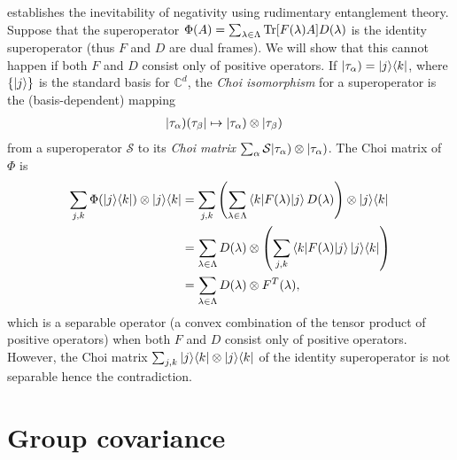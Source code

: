 \cite{ferrie_frame_2008} establishes the inevitability of negativity using rudimentary entanglement theory. Suppose that the superoperator $\Phi(A) = \sum_{\lambda \in \Lambda} \mathrm{Tr} [F(\lambda)A] D(\lambda)$ is the identity superoperator (thus $F$ and $D$ are dual frames). We will show that this cannot happen if both $F$ and $D$ consist only of positive operators. If $|\tau_{\alpha}) = {\left\vert{j}\right\rangle}{\left\langle{k}\right\vert}$, where $\{{\left\vert{j}\right\rangle}\}$ is  the standard basis for $\mathbb{C}^d$, the \emph{Choi isomorphism} for a superoperator is the (basis-dependent) mapping
\begin{align}
	|\tau_{\alpha})(\tau_{\beta}| &\mapsto |\tau_{\alpha}) \otimes |\tau_{\beta})
\end{align}
from a superoperator $\mathcal{S}$ to its \emph{Choi matrix} $\sum_{\alpha} \mathcal{S} |\tau_{\alpha}) \otimes |\tau_{\alpha})$. The Choi matrix of $\Phi$ is
\begin{align*}
\sum_{j,k} \Phi ({\left\vert{j}\right\rangle}{\left\langle{k}\right\vert}) \otimes {\left\vert{j}\right\rangle}{\left\langle{k}\right\vert}
	&= \sum_{j,k} \left( \sum_{\lambda \in \Lambda} \braket{k|F(\lambda)|j} D(\lambda) \right) \otimes {\left\vert{j}\right\rangle}{\left\langle{k}\right\vert} \\	
	 &= \sum_{\lambda \in \Lambda}  D(\lambda) \otimes \left( \sum_{j,k}  \braket{k|F(\lambda)|j} {\left\vert{j}\right\rangle}{\left\langle{k}\right\vert} \right) \\
	 &= \sum_{\lambda \in \Lambda} D(\lambda) \otimes F^T(\lambda),
\end{align*}
which is a separable operator (a convex combination of the tensor product of positive operators) when both $F$ and $D$ consist only of positive operators. However, the Choi matrix $\sum_{j,k} {\left\vert{j}\right\rangle}{\left\langle{k}\right\vert} \otimes {\left\vert{j}\right\rangle}{\left\langle{k}\right\vert}$ of the identity superoperator is not separable hence the contradiction.

\newcommand\rep{U}

\section{Group covariance}

